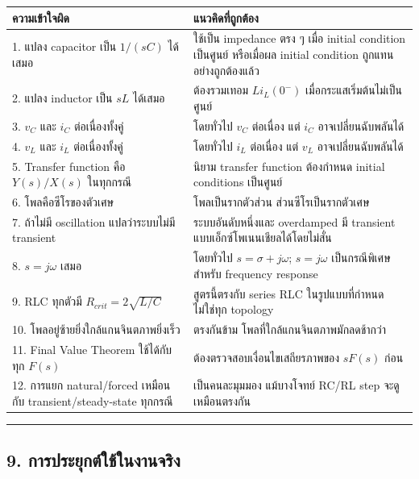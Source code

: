 \begin{table}[htbp]
    \centering
    \begin{tabularx}{\textwidth}{L{0.41\textwidth} Y}
        \hline
        \textbf{ความเข้าใจผิด} & \textbf{แนวคิดที่ถูกต้อง} \\
        . แปลง capacitor เป็น $1/(sC)$ ได้เสมอ & ใช้เป็น impedance ตรง ๆ เมื่อ initial condition เป็นศูนย์ หรือเมื่อผล initial condition ถูกแทนอย่างถูกต้องแล้ว \\
        2. แปลง inductor เป็น $sL$ ได้เสมอ & ต้องรวมเทอม $Li_L(0^-)$ เมื่อกระแสเริ่มต้นไม่เป็นศูนย์ \\
        3. $v_C$ และ $i_C$ ต่อเนื่องทั้งคู่ & โดยทั่วไป $v_C$ ต่อเนื่อง แต่ $i_C$ อาจเปลี่ยนฉับพลันได้ \\
        4. $v_L$ และ $i_L$ ต่อเนื่องทั้งคู่ & โดยทั่วไป $i_L$ ต่อเนื่อง แต่ $v_L$ อาจเปลี่ยนฉับพลันได้ \\
        5. Transfer function คือ $Y(s)/X(s)$ ในทุกกรณี & นิยาม transfer function ต้องกำหนด initial conditions เป็นศูนย์ \\
        6. โพลคือซีโรของตัวเศษ & โพลเป็นรากตัวส่วน ส่วนซีโรเป็นรากตัวเศษ \\
        7. ถ้าไม่มี oscillation แปลว่าระบบไม่มี transient & ระบบอันดับหนึ่งและ overdamped มี transient แบบเอ็กซ์โพเนนเชียลได้โดยไม่สั่น \\
        8. $s=j\omega$ เสมอ & โดยทั่วไป $s=\sigma+j\omega$; $s=j\omega$ เป็นกรณีพิเศษสำหรับ frequency response \\
        9. RLC ทุกตัวมี $R_{crit}=2\sqrt{L/C}$ & สูตรนี้ตรงกับ series RLC ในรูปแบบที่กำหนด ไม่ใช่ทุก topology \\
        10. โพลอยู่ซ้ายยิ่งใกล้แกนจินตภาพยิ่งเร็ว & ตรงกันข้าม โพลที่ใกล้แกนจินตภาพมักลดช้ากว่า \\
        11. Final Value Theorem ใช้ได้กับทุก $F(s)$ & ต้องตรวจสอบเงื่อนไขเสถียรภาพของ $sF(s)$ ก่อน \\
        12. การแยก natural/forced เหมือนกับ transient/steady-state ทุกกรณี & เป็นคนละมุมมอง แม้บางโจทย์ RC/RL step จะดูเหมือนตรงกัน \\
        \hline
    \end{tabularx}
\end{table}

\par\noindent\rule{\textwidth}{0.4pt}\par

\subsection{9. การประยุกต์ใช้ในงานจริง}

